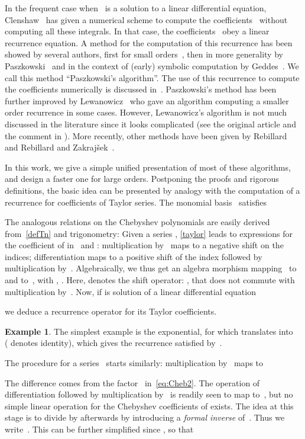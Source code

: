 \documentclass{amsart}
\theoremstyle{definition}
\newtheorem{example}{Example}
\begin{document}
In the frequent case when~ is a solution to a linear differential equation, Clenshaw~\cite{Clenshaw1957} has given a numerical scheme to compute the coefficients~ without computing all these integrals.
In that case, the coefficients~ obey a linear recurrence equation. A method for the computation of this recurrence has been showed by several authors, first for small orders~\cite{FoxParker1968,Luke1969a}, then in more generality by Paszkowski~\cite{Paszkowski1975} and in the context of (early) symbolic computation by Geddes~\cite{Geddes1977}. We call this method ``Paszkowski's algorithm''.
The  use of this recurrence to compute the coefficients numerically is discussed in~\cite{Wimp1984}.
Paszkowski's method has been further improved by Lewanowicz~\cite{Lewanowicz1976} who gave an algorithm computing a smaller order recurrence in some cases. However, Lewanowicz's algorithm is not much discussed in the literature since it looks complicated (see the original article and the comment in \cite[p.~186]{Wimp1984}).
More recently, other methods have been given by Rebillard~\cite{Rebillard1998} and Rebillard and Zakraj\v{s}ek~\cite{RebillardZakrajsek2006}. 

In this work, we give a simple unified presentation of most of these algorithms, and design a faster one for large orders. Postponing the proofs and rigorous definitions, the basic idea can be presented by analogy with the computation of a recurrence for coefficients of Taylor series. The monomial basis~
satisfies

The analogous relations on the Chebyshev polynomials are easily derived from~\eqref{defTn} and trigonometry: 
Given a series , \eqref{taylor} leads to expressions for the coefficient of  in~ and : multiplication by~ maps to a negative shift on the indices; differentiation maps to a positive shift of the index followed by multiplication by~. Algebraically, we thus get an algebra morphism mapping~ to~ and  to~, with , . Here,  denotes the shift operator: , that does not commute with multiplication by~.
Now, if  is solution of a linear differential equation 

we deduce a recurrence operator  for its Taylor coefficients.
\begin{example} The simplest example is the exponential, for which  translates into~ ( denotes identity), which gives the recurrence  satisfied by~. 
\end{example}
The procedure for a series~ starts similarly: multiplication by~ maps to

The difference comes from the factor~ in~\eqref{eq:Cheb2}. The operation of differentiation followed by multiplication by~ is readily seen to map to~, but no simple linear operation for the Chebyshev coefficients of  exists. The idea at this stage is to divide by  afterwards by introducing a \emph{formal inverse} of~. Thus we write~. This can be further simplified since
,
so that 
\end{document}
